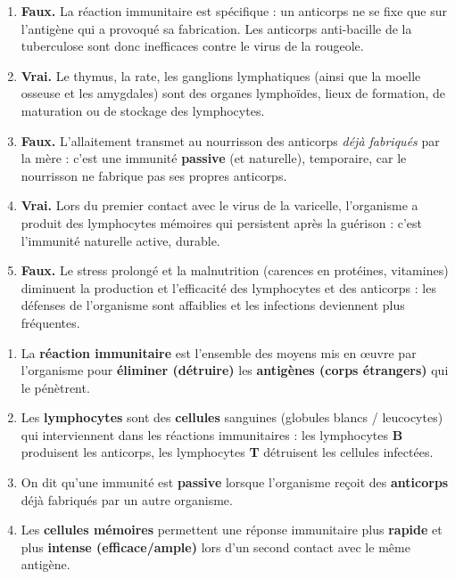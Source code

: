 \documentclass[11pt]{article}
\newcommand{\cle}[1]{{\popxbold\color{popdark}#1}}
\begin{document}
\begin{corrige}
\begin{enumerate}
\item \textbf{Faux.} La réaction immunitaire est \cle{spécifique} : un anticorps ne se fixe que sur l'antigène qui a provoqué sa fabrication. Les anticorps anti-bacille de la tuberculose sont donc inefficaces contre le virus de la rougeole.
\item \textbf{Vrai.} Le \cle{thymus}, la \cle{rate}, les \cle{ganglions lymphatiques} (ainsi que la \cle{moelle osseuse} et les \cle{amygdales}) sont des \cle{organes lymphoïdes}, lieux de formation, de maturation ou de stockage des \cle{lymphocytes}.
\item \textbf{Faux.} L'allaitement transmet au nourrisson des anticorps \emph{déjà fabriqués} par la mère : c'est une immunité \textbf{passive} (et naturelle), temporaire, car le nourrisson ne fabrique pas ses propres anticorps.
\item \textbf{Vrai.} Lors du premier contact avec le virus de la varicelle, l'organisme a produit des \cle{lymphocytes mémoires} qui persistent après la guérison : c'est l'immunité \cle{naturelle active}, durable.
\item \textbf{Faux.} Le \cle{stress} prolongé et la \cle{malnutrition} (carences en protéines, vitamines) diminuent la production et l'efficacité des lymphocytes et des anticorps : les défenses de l'organisme sont affaiblies et les infections deviennent plus fréquentes.
\end{enumerate}
\end{corrige}

\begin{corrige}
\begin{enumerate}
\item La \textbf{réaction immunitaire} est l'ensemble des moyens mis en \oe uvre par l'organisme pour \textbf{éliminer (détruire)} les \textbf{antigènes (corps étrangers)} qui le pénètrent.
\item Les \textbf{lymphocytes} sont des \textbf{cellules} sanguines (globules blancs / leucocytes) qui interviennent dans les réactions immunitaires : les lymphocytes \textbf{B} produisent les anticorps, les lymphocytes \textbf{T} détruisent les cellules infectées.
\item On dit qu'une immunité est \textbf{passive} lorsque l'organisme reçoit des \textbf{anticorps} déjà fabriqués par un autre organisme.
\item Les \textbf{cellules mémoires} permettent une réponse immunitaire plus \textbf{rapide} et plus \textbf{intense (efficace/ample)} lors d'un second contact avec le même antigène.
\end{enumerate}
\end{corrige}
\end{document}
